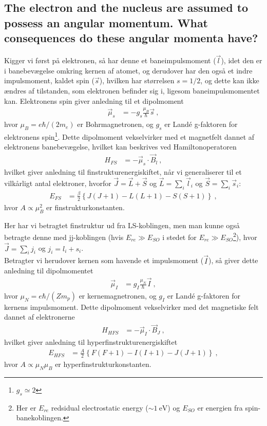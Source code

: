 \subsection{The electron and the nucleus are assumed to possess an angular momentum. What consequences do these angular momenta have?}


Kigger vi først på elektronen, så har denne et baneimpulsmoment ($\Vec{l}$), idet den er i banebevægelse omkring kernen af atomet, og derudover har den også et indre impulsmoment, kaldet spin ($\Vec{s}$), hvilken har størrelsen $s = 1/2$, og dette kan ikke ændres af tilstanden, som elektronen befinder sig i, ligesom baneimpulsmomentet kan. Elektronens spin giver anledning til et dipolmoment
\begin{align}
    \Vec{\mu}_s &= - g_s \frac{\mu_B}{\hbar}\Vec{s} \: ,
\end{align}
hvor $\mu_B = e\hbar/(2m_e)$ er Bohrmagnetronen, og $g_s$ er Landé g-faktoren for elektronens spin\footnote{$g_s \simeq 2$}. Dette dipolmoment vekselvirker med et magnetfelt dannet af elektronens banebevægelse, hvilket kan beskrives ved Hamiltonoperatoren
\begin{align}
    H_{FS} &= - \Vec{\mu}_s \cdot \Vec{B}_l \: ,
\end{align}
hvilket giver anledning til finstrukturenergiskiftet, når vi generaliserer til et vilkårligt antal elektroner, hvorfor $\Vec{J} = \Vec{L} + \Vec{S}$ og $\Vec{L} = \sum_i \Vec{l}_i$ og $\Vec{S} = \sum_i \Vec{s}_i$:
\begin{align}
    E_{FS} &= \frac{\beta}{2} \left\{J(J+1) - L(L+1) - S(S+1)\right\} \: ,
\end{align}
hvor $A \propto \mu_B^2$ er finstrukturkonstanten.

Her har vi betragtet finstruktur ud fra LS-koblingen, men man kunne også betragte denne med jj-koblingen (hvis $E_{re} \gg E_{SO}$ i stedet for $E_{re} \gg E_{SO}$\footnote{Her er $E_{re}$ redsidual electrostatic energy ($\sim \SI{1}{\eV}$) og $E_{SO}$ er energien fra spin-banekoblingen.}), hvor $\Vec{J} = \sum_i j_i$ og $j_i = l_i + s_i$.\\

Betragter vi herudover kernen som havende et impulsmoment ($\Vec{I}$), så giver dette anledning til dipolmomentet
\begin{align}
    \Vec{\mu}_I &= g_I \frac{\mu_N}{\hbar}\Vec{I} \: ,
\end{align}
hvor $\mu_N = e\hbar/(Zm_p)$ er kernemagnetronen, og $g_I$ er Landé g-faktoren for kernens impulsmoment. Dette dipolmoment vekselvirker med det magnetiske felt dannet af elektronerne
\begin{align}
    H_{HFS} &= - \Vec{\mu}_I \cdot \Vec{B}_J \: ,
\end{align}
hvilket giver anledning til hyperfinstrukturenergiskiftet
\begin{align}
    E_{HFS} &= \frac{A}{2} \left\{F(F+1) - I(I+1) - J(J+1)\right\} \: ,
\end{align}
hvor $A \propto \mu_N \mu_B$ er hyperfinstrukturkonstanten.\\

